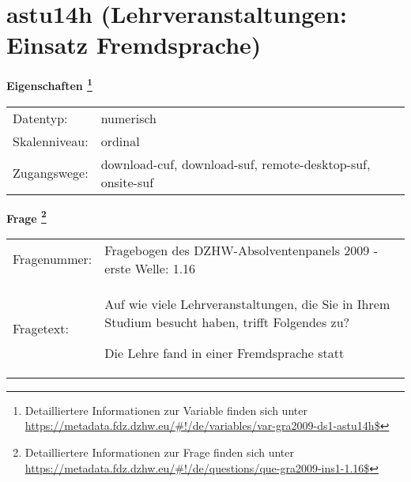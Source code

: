 
    \setcounter{footnote}{0}

    \vspace*{-1.8cm}
	\section{astu14h (Lehrveranstaltungen: Einsatz Fremdsprache)}
	\label{section:astu14h}



    \vspace*{0.5cm}
    \noindent\textbf{Eigenschaften
	\footnote{Detailliertere Informationen zur Variable finden sich unter
		\url{https://metadata.fdz.dzhw.eu/\#!/de/variables/var-gra2009-ds1-astu14h$}}}\\
	\begin{tabularx}{\hsize}{@{}lX}
	Datentyp: & numerisch \\
	Skalenniveau: & ordinal \\
	Zugangswege: &
	  download-cuf, 
	  download-suf, 
	  remote-desktop-suf, 
	  onsite-suf
 \\
    \end{tabularx}



				\vspace*{0.5cm}
                \noindent\textbf{Frage
	                \footnote{Detailliertere Informationen zur Frage finden sich unter
		              \url{https://metadata.fdz.dzhw.eu/\#!/de/questions/que-gra2009-ins1-1.16$}}}\\
				\begin{tabularx}{\hsize}{@{}lX}
					Fragenummer: &
					  Fragebogen des DZHW-Absolventenpanels 2009 - erste Welle:
					  1.16
 \\
					Fragetext: & Auf wie viele Lehrveranstaltungen, die Sie in Ihrem Studium besucht haben, trifft Folgendes zu?\par  Die Lehre fand in einer Fremdsprache statt \\
				\end{tabularx}





